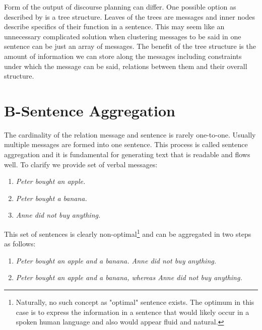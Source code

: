 Form of the output of discourse planning can differ. One possible option as described by \cite{reiter1997building} is a tree structure. Leaves of the trees are messages and inner nodes describe specifics of their function in a sentence. This may seem like an unnecessary complicated solution when clustering messages to be said in one sentence can be just an array of messages. The benefit of the tree structure is the amount of information we can store along the messages including constraints under which the message can be said, relations between them and their overall structure.

\section{B-Sentence Aggregation}
The cardinality of the relation message and sentence is rarely one-to-one. Usually multiple messages are formed into one sentence. This process is called sentence aggregation and it is fundamental for generating text that is readable and flows well. To clarify we provide set of verbal messages:
\begin{enumerate}
	\item \emph{Peter bought an apple.}\label{sa-one}
	\item \emph{Peter bought a banana.}\label{sa-two}
	\item \emph{Anne did not buy anything.}\label{sa-three}	
\end{enumerate}

This set of sentences is clearly non-optimal\footnote{\label{footnote-opt}Naturally, no such concept as "optimal" sentence exists. The optimum in this case is to express the information in a sentence that would likely occur in a spoken human language and also would appear fluid and natural.} and can be aggregated in two steps as follows:
\begin{enumerate}[resume]
	\item \emph{Peter bought an apple and a banana. Anne did not buy anything.}\label{sa-four}
	\item \emph{Peter bought an apple and a banana, whereas Anne did not buy anything.}\label{sa-five}	
\end{enumerate}

